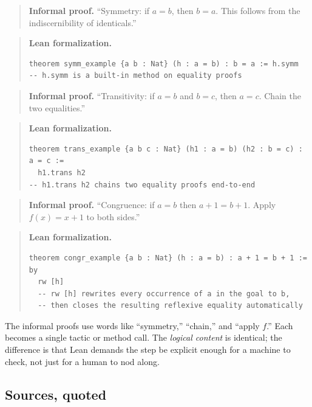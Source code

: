 \begin{quote}
\textbf{Informal proof.} ``Symmetry: if \(a = b\), then \(b = a\). This follows from the indiscernibility of identicals.''
\end{quote}

\begin{quote}
\textbf{Lean formalization.}

\begin{lstlisting}
theorem symm_example {a b : Nat} (h : a = b) : b = a := h.symm
-- h.symm is a built-in method on equality proofs
\end{lstlisting}
\end{quote}

\begin{quote}
\textbf{Informal proof.} ``Transitivity: if \(a = b\) and \(b = c\), then \(a = c\). Chain the two equalities.''
\end{quote}

\begin{quote}
\textbf{Lean formalization.}

\begin{lstlisting}
theorem trans_example {a b c : Nat} (h1 : a = b) (h2 : b = c) : a = c :=
  h1.trans h2
-- h1.trans h2 chains two equality proofs end-to-end
\end{lstlisting}
\end{quote}

\begin{quote}
\textbf{Informal proof.} ``Congruence: if \(a = b\) then \(a + 1 = b + 1\). Apply \(f(x) = x + 1\) to both sides.''
\end{quote}

\begin{quote}
\textbf{Lean formalization.}

\begin{lstlisting}
theorem congr_example {a b : Nat} (h : a = b) : a + 1 = b + 1 := by
  rw [h]
  -- rw [h] rewrites every occurrence of a in the goal to b,
  -- then closes the resulting reflexive equality automatically
\end{lstlisting}
\end{quote}

The informal proofs use words like ``symmetry,'' ``chain,'' and ``apply \(f\).'' Each becomes a single tactic or method call. The \emph{logical content} is identical; the difference is that Lean demands the step be explicit enough for a machine to check, not just for a human to nod along.

\subsection{Sources, quoted}\label{sec:04-propositions-and-proofs:07-equality:3}

